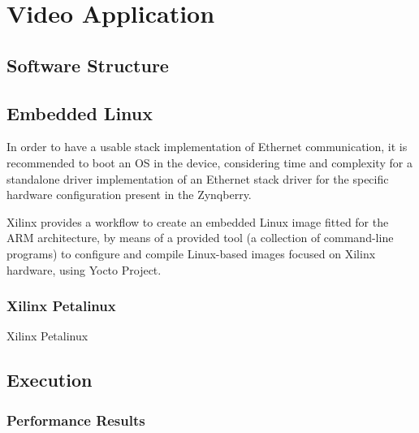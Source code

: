 

\chapter{Video Application}

\section{Software Structure}

\section{Embedded Linux}

In order to have a usable stack implementation of Ethernet communication, it is recommended to boot an OS in the device, considering time and complexity for a standalone driver implementation of an Ethernet stack driver for the specific hardware configuration present in the Zynqberry.

Xilinx provides a workflow to create an embedded Linux image fitted for the ARM architecture, by means of a provided tool (a collection of command-line programs) to configure and compile Linux-based images focused on Xilinx hardware, using Yocto Project.

\subsection{Xilinx Petalinux}

Xilinx Petalinux 

\section{Execution}

\subsection{Performance Results}